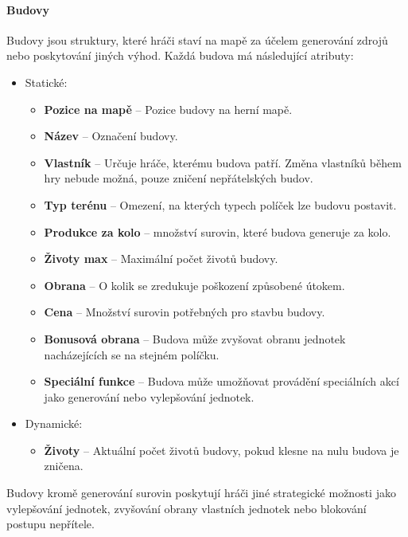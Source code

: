\paragraph{Budovy}
Budovy jsou struktury, které hráči staví na mapě za účelem generování zdrojů nebo poskytování jiných výhod. Každá budova má následující atributy:
\begin{itemize}
    \item Statické:
    \begin{itemize}
        \item \textbf{Pozice na mapě} -- Pozice budovy na herní mapě.
        \item \textbf{Název} -- Označení budovy.
        \item \textbf{Vlastník} -- Určuje hráče, kterému budova patří. Změna vlastníků během hry nebude možná, pouze zničení nepřátelských budov.
        \item \textbf{Typ terénu} -- Omezení, na kterých typech políček lze budovu postavit.
        \item \textbf{Produkce za kolo} – množství surovin, které budova generuje za kolo.
        \item \textbf{Životy max} -- Maximální počet životů budovy.
        \item \textbf{Obrana} -- O kolik se zredukuje poškození způsobené útokem.
        \item \textbf{Cena} -- Množství surovin potřebných pro stavbu budovy.
        \item \textbf{Bonusová obrana} -- Budova může zvyšovat obranu jednotek nacházejících se na stejném políčku.
        \item \textbf{Speciální funkce} -- Budova může umožňovat provádění speciálních akcí jako generování nebo vylepšování jednotek.
    \end{itemize}
    \item Dynamické:
    \begin{itemize}
        \item \textbf{Životy} -- Aktuální počet životů budovy, pokud klesne na nulu budova je zničena.
    \end{itemize}
\end{itemize}
Budovy kromě generování surovin poskytují hráči jiné strategické možnosti jako vylepšování jednotek, zvyšování obrany vlastních jednotek nebo blokování postupu nepřítele.

